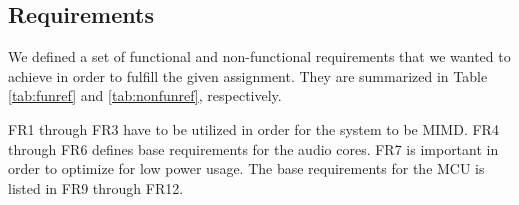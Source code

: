 \subsection{Requirements}\label{intro:requirements}
We defined a set of functional and non-functional requirements
that we wanted to achieve in order to fulfill the given assignment.
They are summarized in Table \ref{tab:funref} and \ref{tab:nonfunref},
respectively.




FR1 through FR3 have to be utilized in order for the system to be MIMD.
FR4 through FR6 defines base requirements for the audio cores.
FR7 is important in order to optimize for low power usage. The base
requirements for the MCU is listed in FR9 through FR12.
